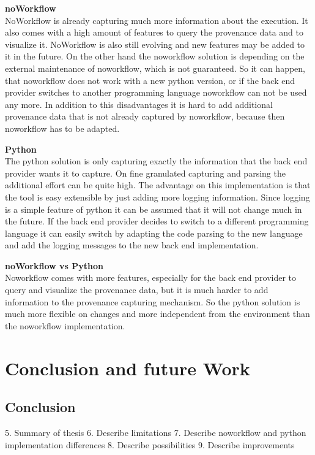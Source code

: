 \documentclass[draft,final]{vutinfth} %
\begin{document}
\textbf{noWorkflow} \\
NoWorkflow is already capturing much more information about the execution. It also comes with a high amount of features to query the provenance data and to visualize it. NoWorkflow is also still evolving and new features may be added to it in the future. On the other hand the noworkflow solution is depending on the external maintenance of noworkflow, which is not guaranteed. So it can happen, that noworkflow does not work with a new python version, or if the back end provider switches to another programming language noworkflow can not be used any more. In addition to this disadvantages it is hard to add additional provenance data that is not already captured by noworkflow, because then noworkflow has to be adapted.

\textbf{Python} \\
The python solution is only capturing exactly the information that the back end provider wants it to capture. On fine granulated capturing and parsing the additional effort can be quite high. The advantage on this implementation is that the tool is easy extensible by just adding more logging information. Since logging is a simple feature of python it can be assumed that it will not change much in the future. If the back end provider decides to switch to a different programming language it can easily switch by adapting the code parsing to the new language and add the logging messages to the new back end implementation. 

\textbf{noWorkflow vs Python} \\
Noworkflow comes with more features, especially for the back end provider to query and visualize the provenance data, but it is much harder to add information to the provenance capturing mechanism. So the python solution is much more flexible on changes and more independent from the environment than the noworkflow implementation. 

\chapter{Conclusion and future Work}\label{Conclusion}

\section{Conclusion}
5.	Summary of thesis
6.	Describe limitations
7.	Describe noworkflow and python implementation differences 
8.	Describe possibilities
9.	Describe improvements
\end{document}
